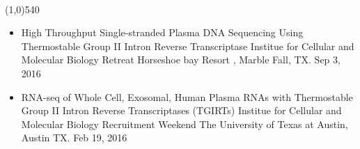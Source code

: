 \documentclass[dvips,11pt]{article}
\begin{document}
 \vspace{-1.5mm}
\\\noindent
\line(1,0){540}\\
\vspace{-6mm}
\begin{itemize}
	\setlength{\itemsep}{0pt}
	\item High Throughput Single-stranded Plasma DNA Sequencing Using Thermostable Group II Intron Reverse Transcriptase \newline
		Institue for Cellular and Molecular Biology Retreat \newline
		Horseshoe bay Resort , Marble Fall, TX. Sep 3, 2016
	\item RNA-seq of Whole Cell, Exosomal, Human Plasma RNAs with Thermostable Group II Intron Reverse Transcriptases (TGIRTs) \newline
		Institue for Cellular and Molecular Biology Recruitment Weekend \newline
		The University of Texas at Austin, Austin TX. Feb 19, 2016
\end{itemize}


\end{document}
